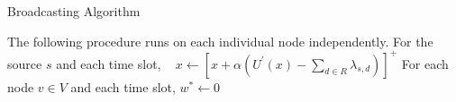 \documentclass[10pt,conference]{IEEEtran}
\begin{document}
\begin{algorithm}[hbt!]
\caption{Broadcasting Algorithm}
\label{alg:bp}
\begin{algorithmic}[1]
\STATE The following procedure runs on each individual node independently.
\STATE For the source $s$ and each time slot,
\STATE $\;\;\;$$x\leftarrow \left[x+ \alpha(U^{'}(x)-\sum_{d\in R}\lambda_{s,d})\right]^{+}$
\STATE For each node $v\in V$ and each time slot,
\STATE $w^{*}\leftarrow 0$
   \ENDFOR
   \ENDIF
\ENDFOR
{}
      \ENDIF
   \ENDFOR
\ENDIF
{}
\ENDFOR
\end{algorithmic}
\end{algorithm}
\end{document}
